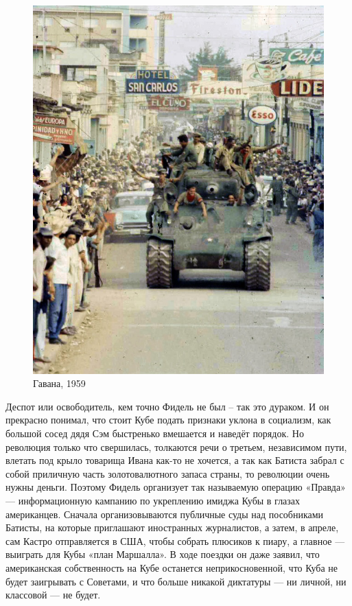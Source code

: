 \begin{figure}[h!tb] 
	\centering\includegraphics[scale=0.4]{KubaUSSR/jaXlM1B_0-U.jpg}
	\caption{Гавана, 1959 }%
\end{figure}

Деспот или освободитель, кем точно Фидель не был – так это дураком. И он прекрасно понимал, что стоит Кубе подать признаки уклона в социализм, как большой сосед дядя Сэм быстренько вмешается и наведёт порядок. Но революция только что свершилась, толкаются речи о третьем, независимом пути, влетать под крыло товарища Ивана как-то не хочется, а так как Батиста забрал с собой приличную часть золотовалютного запаса страны, то революции очень нужны деньги. Поэтому Фидель организует так называемую операцию «Правда» — информационную кампанию по укреплению имиджа Кубы в глазах американцев. Сначала организовываются публичные суды над пособниками Батисты, на которые приглашают иностранных журналистов, а затем, в апреле, сам Кастро отправляется в США, чтобы собрать плюсиков к пиару, а главное — выиграть для Кубы «план Маршалла». В ходе поездки он даже заявил, что американская собственность на Кубе останется неприкосновенной, что Куба не будет заигрывать с Советами, и что больше никакой диктатуры — ни личной, ни классовой — не будет.

